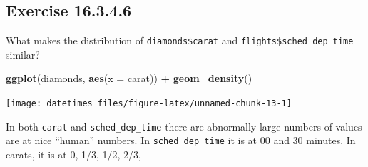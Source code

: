 \documentclass[]{book}
\newenvironment{Shaded}{\begin{snugshade}}{\end{snugshade}}
\newcommand{\CommentTok}[1]{\textcolor[rgb]{0.56,0.35,0.01}{\textit{#1}}}
\newcommand{\DataTypeTok}[1]{\textcolor[rgb]{0.13,0.29,0.53}{#1}}
\newcommand{\KeywordTok}[1]{\textcolor[rgb]{0.13,0.29,0.53}{\textbf{#1}}}
\newcommand{\NormalTok}[1]{#1}
\newcommand{\OperatorTok}[1]{\textcolor[rgb]{0.81,0.36,0.00}{\textbf{#1}}}
\newcommand{\OtherTok}[1]{\textcolor[rgb]{0.56,0.35,0.01}{#1}}
\newcommand{\StringTok}[1]{\textcolor[rgb]{0.31,0.60,0.02}{#1}}
\theoremstyle{plain}
\theoremstyle{remark}
\begin{document}
\begin{Shaded}
\end{Shaded}

\hypertarget{exercise-16.3.4.6}{%
\subsection*{\texorpdfstring{Exercise {16.3.4.6}}{Exercise 16.3.4.6}}\label{exercise-16.3.4.6}}

What makes the distribution of \texttt{diamonds\$carat} and \texttt{flights\$sched\_dep\_time} similar?

\begin{Shaded}
\begin{Highlighting}[]
\KeywordTok{ggplot}\NormalTok{(diamonds, }\KeywordTok{aes}\NormalTok{(}\DataTypeTok{x =}\NormalTok{ carat)) }\OperatorTok{+}
\StringTok{  }\KeywordTok{geom_density}\NormalTok{()}
\end{Highlighting}
\end{Shaded}

\begin{center}\texttt{[image: datetimes\_files/figure-latex/unnamed-chunk-13-1]} \end{center}

In both \texttt{carat} and \texttt{sched\_dep\_time} there are abnormally large numbers of values are at nice ``human'' numbers. In \texttt{sched\_dep\_time} it is at 00 and 30 minutes. In carats, it is at 0, 1/3, 1/2, 2/3,
\end{document}
